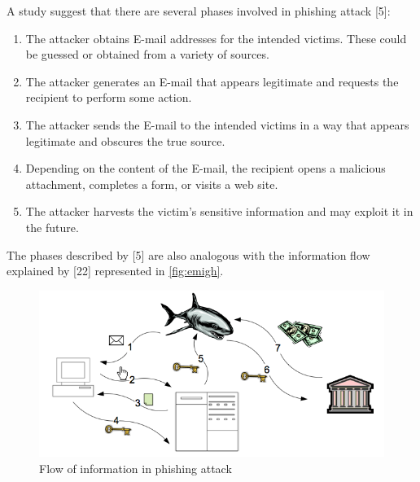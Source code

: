 A study suggest that there are several phases involved in phishing
attack {[}5{]}: 
\begin{enumerate}
\item The attacker obtains E-mail addresses for the intended victims. These
could be guessed or obtained from a variety of sources. 
\item The attacker generates an E-mail that appears legitimate and requests
the recipient to perform some action. 
\item The attacker sends the E-mail to the intended victims in a way that
appears legitimate and obscures the true source.
\item Depending on the content of the E-mail, the recipient opens a malicious
attachment, completes a form, or visits a web site. 
\item The attacker harvests the victim\textquoteright s sensitive information
and may exploit it in the future. 
\end{enumerate}
The phases described by {[}5{]} are also analogous with the information
flow explained by {[}22{]} represented in \autoref{fig:emigh}. 

\begin{figure}


\begin{centering}
\includegraphics[scale=0.4]{gfx/emigh}\protect\caption{\label{fig:emigh}Flow of information in phishing attack \citep{emigh:2005}}

\par\end{centering}

\end{figure}


